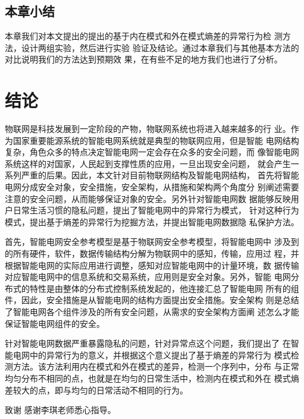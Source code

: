 \documentclass[10.5pt,twocolumn]{jbuaa}
\begin{document}
\subsection{本章小结}
本章我们对本文提出的提出的基于内在模式和外在模式熵差的异常行为检
测方法，设计两组实验，然后进行实验
验证及结论。通过本章我们与其他基本方法的对比说明我们的方法达到预期效
果，在有些不足的地方我们也进行了分析。

\section{结论}
物联网是科技发展到一定阶段的产物，物联网系统也将进入越来越多的行
业。作为国家重要能源系统的智能电网系统就是典型的物联网应用，但是智能
电网结构复杂，角色众多的特点决定智能电网一定会存在众多的安全问题，而
像智能电网系统这样的对国家，人民起到支撑性质的应用，一旦出现安全问题，
就会产生一系列严重的后果。因此，本文针对目前物联网结构及智能电网结构，
首先将智能电网分成安全对象，安全措施，安全架构，从措施和架构两个角度分
别阐述需要注意的安全问题，从而能够保证对象的安全。另外针对智能电网数
据能够反映用户日常生活习惯的隐私问题，提出了智能电网中的异常行为模式，
针对这种行为模式，提出基于熵差的异常行为挖掘方法，并提出智能电网数据隐
私保护方法。

首先，智能电网安全参考模型是基于物联网安全参考模型，将智能电网中
涉及到的所有硬件，软件，数据传输结构分解为物联网中的感知，传输，应用过
程，并根据智能电网的实际应用进行调整，感知对应智能电网中的计量环境，数
据传输对应智能电网中的信息系统和交易系统，应用则是安全对象。另外，智能
电网分布式的特性是由整体的分布式控制系统发起的，他连接汇总了智能电网
所有的组件，因此，安全措施是从智能电网的结构方面提出安全措施。安全架构
则是总结了智能电网各个组件涉及的所有安全问题，从需求的安全架构方面阐
述怎么才能保证智能电网组件的安全。

针对智能电网数据严重暴露隐私的问题，针对异常点这个问题，我们提出了
在智能电网中的异常行为的意义，并根据这个意义提出了基于熵差的异常行为
模式检测方法。该方法利用内在模式和外在模式的差异，检测一个序列中，分布
与正常均匀分布不相同的点，也就是在均匀的日常生活中，检测内在模式和外在
模式熵差较大的点，即与均匀的日常活动不相同的行为。

\vspace{1em}
{\hei\wuhao 致谢\quad}
{\fang\wuhao
感谢李琪老师悉心指导。
}



\end{document}
